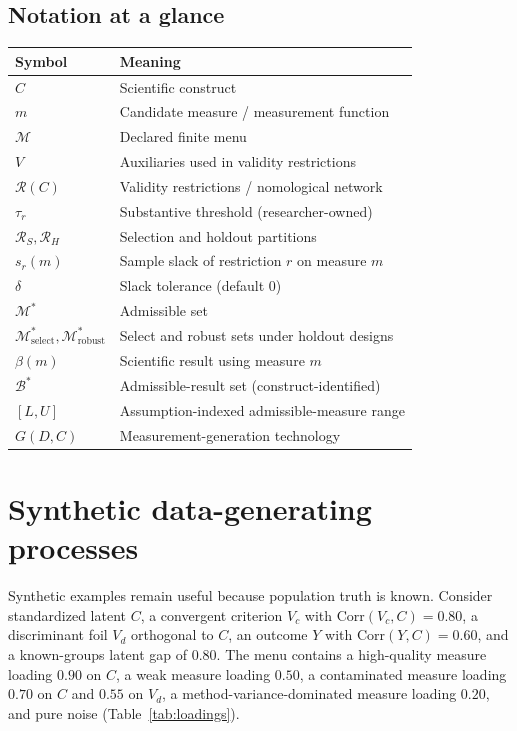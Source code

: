 \documentclass[10pt,letterpaper]{article}
\newcommand{\M}{\ensuremath{\mathcal{M}}}
\newcommand{\Rset}{\mathcal{R}}
\newcommand{\Bset}{\mathcal{B}}
\begin{document}
\subsection{Notation at a glance}
\begin{center}
\small
\begin{tabular}{@{}ll@{}}
\toprule
Symbol & Meaning \\
\midrule
$C$ & Scientific construct \\
$m$ & Candidate measure / measurement function \\
$\M$ & Declared finite menu \\
$V$ & Auxiliaries used in validity restrictions \\
$\Rset(C)$ & Validity restrictions / nomological network \\
$\tau_r$ & Substantive threshold (researcher-owned) \\
$\Rset_S,\Rset_H$ & Selection and holdout partitions \\
$s_r(m)$ & Sample slack of restriction $r$ on measure $m$ \\
$\delta$ & Slack tolerance (default $0$) \\
$\M^*$ & Admissible set \\
$\M^*_{\mathrm{select}},\M^*_{\mathrm{robust}}$ & Select and robust sets under holdout designs \\
$\beta(m)$ & Scientific result using measure $m$ \\
$\Bset^*$ & Admissible-result set (construct-identified) \\
$[L,U]$ & Assumption-indexed admissible-measure range \\
$G(D,C)$ & Measurement-generation technology \\
\bottomrule
\end{tabular}
\end{center}

\section{Synthetic data-generating processes}
\label{app:dgp}

Synthetic examples remain useful because population truth is known.
Consider standardized latent $C$, a convergent criterion $V_c$ with $\mathrm{Corr}(V_c,C)=0.80$, a discriminant foil $V_d$ orthogonal to $C$, an outcome $Y$ with $\mathrm{Corr}(Y,C)=0.60$, and a known-groups latent gap of $0.80$.
The menu contains a high-quality measure loading $0.90$ on $C$, a weak measure loading $0.50$, a contaminated measure loading $0.70$ on $C$ and $0.55$ on $V_d$, a method-variance-dominated measure loading $0.20$, and pure noise (Table~\ref{tab:loadings}).
\end{document}
